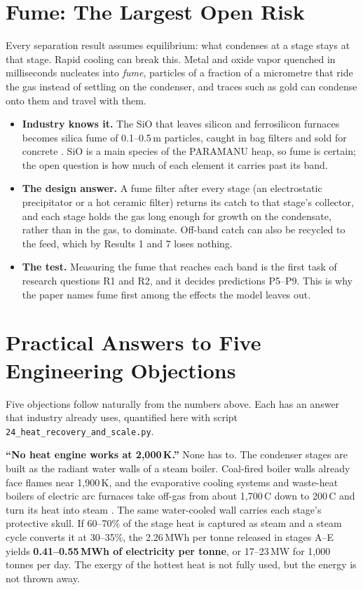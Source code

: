 \documentclass[11pt,a4paper]{article}
\begin{document}
\section{Fume: The Largest Open Risk}\label{ch:fume}
Every separation result assumes equilibrium: what condenses at a stage stays at that stage. Rapid cooling can break this. Metal and oxide vapor quenched in milliseconds nucleates into \emph{fume}, particles of a fraction of a micrometre that ride the gas instead of settling on the condenser, and traces such as gold can condense onto them and travel with them.
\begin{itemize}
\item \textbf{Industry knows it.} The SiO that leaves silicon and ferrosilicon furnaces becomes silica fume of 0.1--0.5\,\textmu m particles, caught in bag filters and sold for concrete \citep{aci234r06}. SiO is a main species of the PARAMANU heap, so fume is certain; the open question is how much of each element it carries past its band.
\item \textbf{The design answer.} A fume filter after every stage (an electrostatic precipitator or a hot ceramic filter) returns its catch to that stage's collector, and each stage holds the gas long enough for growth on the condensate, rather than in the gas, to dominate. Off-band catch can also be recycled to the feed, which by Results 1 and 7 loses nothing.
\item \textbf{The test.} Measuring the fume that reaches each band is the first task of research questions R1 and R2, and it decides predictions P5--P9. This is why the paper names fume first among the effects the model leaves out.
\end{itemize}

\section{Practical Answers to Five Engineering Objections}\label{ch:practical}
Five objections follow naturally from the numbers above. Each has an answer that industry already uses, quantified here with script \texttt{24\_heat\_recovery\_and\_scale.py}.

\textbf{``No heat engine works at 2,000\,K.''} None has to. The condenser stages are built as the radiant water walls of a steam boiler. Coal-fired boiler walls already face flames near 1,900\,K, and the evaporative cooling systems and waste-heat boilers of electric arc furnaces take off-gas from about 1,700\,\textdegree C down to 200\,\textdegree C and turn its heat into steam \citep{gandt2016}. The same water-cooled wall carries each stage's protective skull. If 60--70\% of the stage heat is captured as steam and a steam cycle converts it at 30--35\%, the 2.26\,MWh per tonne released in stages A--E yields \textbf{0.41--0.55\,MWh of electricity per tonne}, or 17--23\,MW for 1,000 tonnes per day. The exergy of the hottest heat is not fully used, but the energy is not thrown away.
\end{document}
